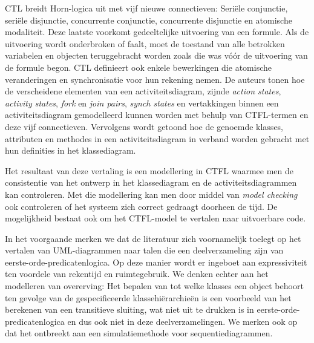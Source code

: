 CTL breidt Horn-logica uit met vijf nieuwe connectieven: Seri\"ele conjunctie, seri\"ele disjunctie, concurrente conjunctie, concurrente disjunctie en atomische modaliteit. Deze laatste voorkomt gedeeltelijke uitvoering van een formule. Als de uitvoering wordt onderbroken of faalt, moet de toestand van alle betrokken variabelen en objecten teruggebracht worden zoals die was v\'o\'or de uitvoering van de formule begon. CTL definieert ook enkele bewerkingen die atomische veranderingen en synchronisatie voor hun rekening nemen. De auteurs tonen hoe de verscheidene elementen van een activiteitsdiagram, zijnde \textit{action states}, \textit{activity states}, \textit{fork} en \textit{join pairs}, \textit{synch states} en vertakkingen binnen een activiteitsdiagram gemodelleerd kunnen worden met behulp van CTFL-termen en deze vijf connectieven. Vervolgens wordt getoond hoe de genoemde klasses, attributen en methodes in een activiteitsdiagram in verband worden gebracht met hun definities in het klassediagram.

Het resultaat van deze vertaling is een modellering in CTFL waarmee men de consistentie van het ontwerp in het klassediagram en de activiteitsdiagrammen kan controleren. Met die modellering kan men door middel van \textit{model checking} ook controleren of het systeem zich correct gedraagt doorheen de tijd. De mogelijkheid bestaat ook om het CTFL-model te vertalen naar uitvoerbare code.

\parbreak

In het voorgaande merken we dat de literatuur zich voornamelijk toelegt op het vertalen van UML-diagrammen naar talen die een deelverzameling zijn van eerste-orde-predicatenlogica. Op deze manier wordt er ingeboet aan expressiviteit ten voordele van rekentijd en ruimtegebruik. We denken echter aan het modelleren van overerving: Het bepalen van tot welke klasses een object behoort ten gevolge van de gespecificeerde klassehi\"erarchie\"en is een voorbeeld van het berekenen van een transitieve sluiting, wat niet uit te drukken is in eerste-orde-predicatenlogica en dus ook niet in deze deelverzamelingen. We merken ook op dat het ontbreekt aan een simulatiemethode voor sequentiediagrammen.